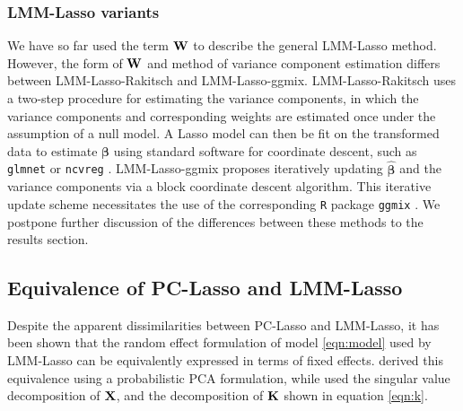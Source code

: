 \subsubsection{LMM-Lasso variants}

We have so far used the term $\textbf{W}$ to describe the general LMM-Lasso method. However, the form of $\textbf{W}$ and method of variance component estimation differs between LMM-Lasso-Rakitsch and LMM-Lasso-ggmix. LMM-Lasso-Rakitsch \cite{Rakitsch2012} uses a two-step procedure for estimating the variance components, in which the variance components and corresponding weights are estimated once under the assumption of a null model. A Lasso model can then be fit on the transformed data to estimate $\boldsymbol{\beta}$ using standard software for coordinate descent, such as \texttt{glmnet} \cite{glmnet} or \texttt{ncvreg} \cite{ncvreg}. LMM-Lasso-ggmix \cite{bhatnagar2019simultaneous} proposes iteratively updating $\widehat{\boldsymbol{\beta}}$ and the variance components via a block coordinate descent algorithm. This iterative update scheme necessitates the use of the corresponding \texttt{R} package \texttt{ggmix} \cite{ggmix, bhatnagar2019simultaneous}. We postpone further discussion of the differences between these methods to the results section.



\subsection{Equivalence of PC-Lasso and LMM-Lasso}

Despite the apparent dissimilarities between PC-Lasso and LMM-Lasso, it has been shown that the random effect formulation of model \ref{eqn:model} used by LMM-Lasso can be equivalently expressed in terms of fixed effects. \cite{zhang2015principal} derived this equivalence using a probabilistic PCA formulation, while \cite{hoffman2013correcting} used the singular value decomposition of $\textbf{X}$, and the decomposition of $\textbf{K}$ shown in equation \ref{eqn:k}. 

